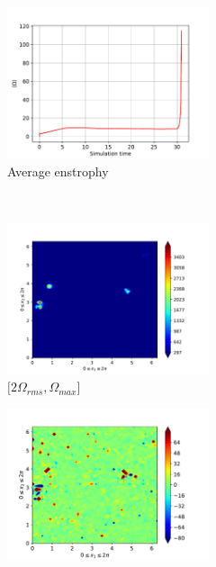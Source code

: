 \begin{figure}[H]
    \begin{subfigure}[H]{0.45\textwidth}
        \includegraphics[height=1.75in]{media/run-cds-65/enst-average1460}
        \caption{Average enstrophy}
    \end{subfigure}
    ~
    \begin{subfigure}[H]{0.45\textwidth}
        \includegraphics[height=1.75in]{media/run-cds-65/enst-2-1460}
        \caption{$[2\Omega_{rms}, \Omega_{max} $] }
    \end{subfigure}
    \newline
    \begin{subfigure}[H]{0.45\textwidth}
        \includegraphics[height=1.75in]{media/run-cds-65/enst-1460}

\end{subfigure}
\end{figure}
